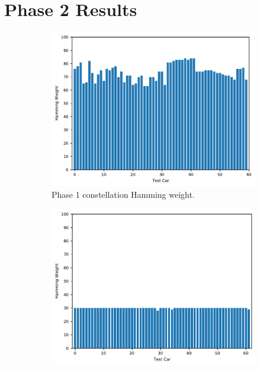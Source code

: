 \documentclass[aps,pra,twocolumn,superscriptaddress,groupedaddress]{revtex4}  %
\begin{document}
\section{Phase 2 Results}

\begin{figure}
  \centering
  \begin{subfigure}[b]{.475\textwidth}
    \centering
    \includegraphics[width=\textwidth]{figures/phase2/2-prod-hamming.pdf}  
    \caption{Phase 1 constellation Hamming weight.}
    \label{fig:sub-first}
  \end{subfigure}
  \hfill
  \begin{subfigure}[b]{.475\textwidth}
    \centering
    \includegraphics[width=\textwidth]{figures/phase2/2p-prod-hamming.pdf}  

\end{subfigure}
\end{figure}
\end{document}
